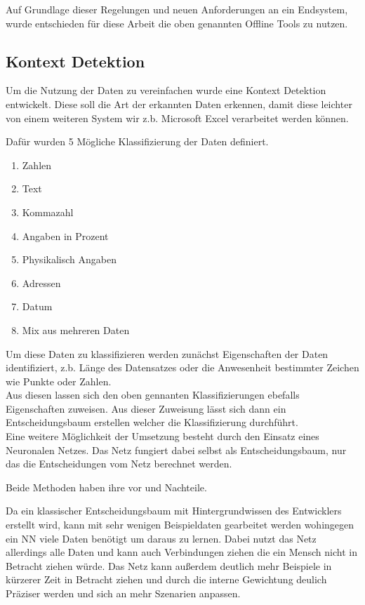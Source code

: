 \documentclass[
]{article}
\begin{document}
Auf Grundlage dieser Regelungen und neuen Anforderungen an ein
Endsystem, wurde entschieden für diese Arbeit die oben genannten Offline
Tools zu nutzen.

\hypertarget{header-n175}{%
\subsection{Kontext Detektion}\label{header-n175}}

Um die Nutzung der Daten zu vereinfachen wurde eine Kontext Detektion
entwickelt. Diese soll die Art der erkannten Daten erkennen, damit diese
leichter von einem weiteren System wir z.b. Microsoft Excel verarbeitet
werden können.

Dafür wurden 5 Mögliche Klassifizierung der Daten definiert.

\begin{enumerate}
\def\labelenumi{\arabic{enumi}.}
\item
  Zahlen
\item
  Text
\item
  Kommazahl
\item
  Angaben in Prozent
\item
  Physikalisch Angaben
\item
  Adressen
\item
  Datum
\item
  Mix aus mehreren Daten
\end{enumerate}

Um diese Daten zu klassifizieren werden zunächst Eigenschaften der Daten
identifiziert, z.b. Länge des Datensatzes oder die Anwesenheit
bestimmter Zeichen wie Punkte oder Zahlen. \\
Aus diesen lassen sich den oben gennanten Klassifizierungen ebefalls
Eigenschaften zuweisen. Aus dieser Zuweisung lässt sich dann ein
Entscheidungsbaum erstellen welcher die Klassifizierung durchführt.\\
Eine weitere Möglichkeit der Umsetzung besteht durch den Einsatz eines
Neuronalen Netzes. Das Netz fungiert dabei selbst als Entscheidungsbaum,
nur das die Entscheidungen vom Netz berechnet werden.

Beide Methoden haben ihre vor und Nachteile.

Da ein klassischer Entscheidungsbaum mit Hintergrundwissen des
Entwicklers erstellt wird, kann mit sehr wenigen Beispieldaten
gearbeitet werden wohingegen ein NN viele Daten benötigt um daraus zu
lernen. Dabei nutzt das Netz allerdings alle Daten und kann auch
Verbindungen ziehen die ein Mensch nicht in Betracht ziehen würde. Das
Netz kann außerdem deutlich mehr Beispiele in kürzerer Zeit in Betracht
ziehen und durch die interne Gewichtung deulich Präziser werden und sich
an mehr Szenarien anpassen.
\end{document}
